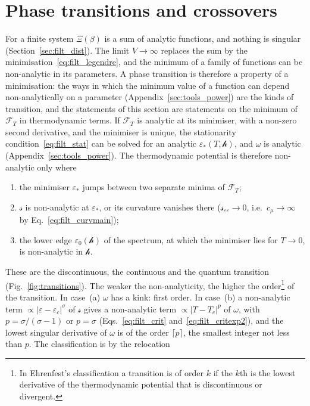 \documentclass[10pt,a4paper]{article}
\theoremstyle{plain}
\newcommand{\hfield}{\mathscr{h}}  %
\newcommand{\Fen}[1][T]{\mathscr{F}_{#1}}  %
\newcommand{\lds}{\mathscr{s}}  %
\begin{document}
\section{Phase transitions and crossovers}
\label{sec:transitions}

For a finite system $\Xi(\beta)$ is a sum of analytic functions, and nothing
is singular (Section~\ref{sec:filt_dist}). The limit $V\to\infty$ replaces
the sum by the minimisation~\eqref{eq:filt_legendre}, and the minimum of a
family of functions can be non-analytic in its parameters. A phase
transition is therefore a property of a minimisation: the ways in which the
minimum value of a function can depend non-analytically on a parameter
(Appendix~\ref{sec:tools_power}) are the kinds of transition, and the
statements of this section are statements on the minimum of $\Fen$ in
thermodynamic terms. If $\Fen$ is
analytic at its minimiser, with a non-zero second derivative, and the
minimiser is unique, the stationarity condition~\eqref{eq:filt_stat} can be
solved for an analytic $\varepsilon_*(T,\hfield)$, and $\omega$ is analytic
(Appendix~\ref{sec:tools_power}). The thermodynamic potential is therefore
non-analytic only where
\begin{enumerate}[label=(\alph*),itemsep=0pt]
\item the minimiser $\varepsilon_*$ jumps between two separate minima of
  $\Fen$;
\item $\lds$ is non-analytic at $\varepsilon_*$, or its curvature vanishes
  there ($\lds_{\varepsilon\varepsilon}\to0$, i.e.\ $c_\mu\to\infty$ by
  Eq.~\eqref{eq:filt_curvmain});
\item the lower edge $\varepsilon_0(\hfield)$ of the spectrum, at which the
  minimiser lies for $T\to0$, is non-analytic in $\hfield$.
\end{enumerate}
These are the discontinuous, the continuous and the quantum transition
(Fig.~\ref{fig:transitions}). The weaker the non-analyticity, the higher the
order\footnote{In Ehrenfest's classification a transition is of order $k$ if
the $k$th is the lowest derivative of the thermodynamic potential that is
discontinuous or divergent.} of the transition. In case~(a) $\omega$ has a
kink: first order. In case~(b) a non-analytic term
$\propto|\varepsilon-\varepsilon_c|^{\sigma}$ of $\lds$ gives a non-analytic
term $\propto|T-T_c|^{p}$ of $\omega$, with $p=\sigma/(\sigma-1)$ or
$p=\sigma$ (Eqs.~\eqref{eq:filt_crit} and~\eqref{eq:filt_critexp2}), and the
lowest singular derivative of $\omega$ is of the order $\lceil p\rceil$, the
smallest integer not less than $p$. The classification is by the relocation
\end{document}
